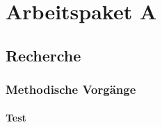 \chapter{Arbeitspaket A}

\section{Recherche}

\subsection{Methodische Vorgänge}

\subsubsection{Test}